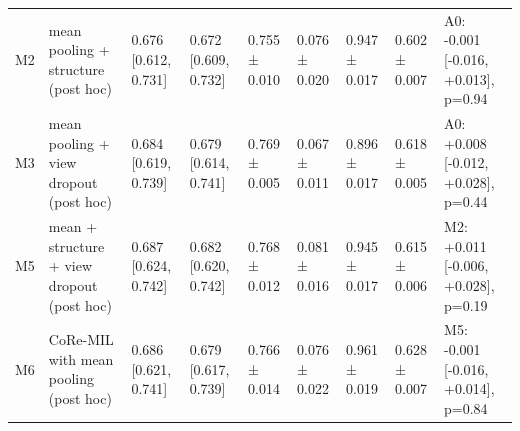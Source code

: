 \begin{table}
\begin{tabular}{lllllllll}
M2 & mean pooling + structure (post hoc) & 0.676 [0.612, 0.731] & 0.672 [0.609, 0.732] & 0.755 ± 0.010 & 0.076 ± 0.020 & 0.947 ± 0.017 & 0.602 ± 0.007 & A0: -0.001 [-0.016, +0.013], p=0.94 \\
M3 & mean pooling + view dropout (post hoc) & 0.684 [0.619, 0.739] & 0.679 [0.614, 0.741] & 0.769 ± 0.005 & 0.067 ± 0.011 & 0.896 ± 0.017 & 0.618 ± 0.005 & A0: +0.008 [-0.012, +0.028], p=0.44 \\
M5 & mean + structure + view dropout (post hoc) & 0.687 [0.624, 0.742] & 0.682 [0.620, 0.742] & 0.768 ± 0.012 & 0.081 ± 0.016 & 0.945 ± 0.017 & 0.615 ± 0.006 & M2: +0.011 [-0.006, +0.028], p=0.19 \\
M6 & CoRe-MIL with mean pooling (post hoc) & 0.686 [0.621, 0.741] & 0.679 [0.617, 0.739] & 0.766 ± 0.014 & 0.076 ± 0.022 & 0.961 ± 0.019 & 0.628 ± 0.007 & M5: -0.001 [-0.016, +0.014], p=0.84 \\
\bottomrule
\end{tabular}
\end{table}
